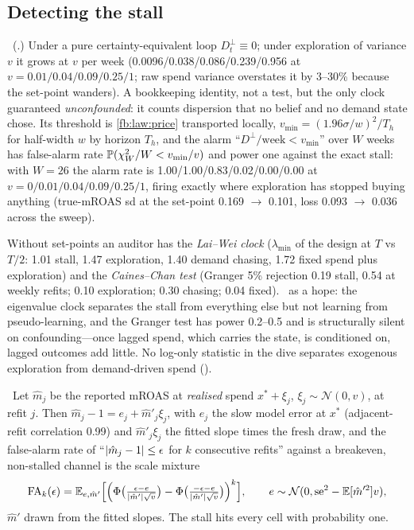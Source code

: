\subsection{Detecting the stall}

\begin{construction}
\label{fb:con:clock}
\tagEstablished\ (.) Under a pure certainty-equivalent loop $D^\perp_t \equiv 0$; under exploration of variance $v$ it grows at $v$ per week (0.0096/0.038/0.086/0.239/0.956 at $v = 0.01/0.04/0.09/0.25/1$; raw spend variance overstates it by 3--30\% because the set-point wanders). A bookkeeping identity, not a test, but the only clock guaranteed \emph{unconfounded}: it counts dispersion that no belief and no demand state chose. Its threshold is \cref{fb:law:price} transported locally, $v_{\min} = (1.96\sigma/w)^2/T_h$ for half-width $w$ by horizon $T_h$, and the alarm ``$D^\perp/\text{week} < v_{\min}$'' over $W$ weeks has false-alarm rate $\mathbb{P}(\chi^2_W/W < v_{\min}/v)$ and power one against the exact stall: with $W = 26$ the alarm rate is 1.00/1.00/0.83/0.02/0.00/0.00 at $v = 0/0.01/0.04/0.09/0.25/1$, firing exactly where exploration has stopped buying anything (true-mROAS sd at the set-point 0.169 $\to$ 0.101, loss 0.093 $\to$ 0.036 across the sweep).
\end{construction}

Without set-points an auditor has the \emph{Lai--Wei clock} ($\lambda_{\min}$ of the design at $T$ vs $T/2$: 1.01 stall, 1.47 exploration, 1.40 demand chasing, 1.72 fixed spend plus exploration) and the \emph{Caines--Chan test} (Granger 5\% rejection 0.19 stall, 0.54 at weekly refits; 0.10 exploration; 0.30 chasing; 0.04 fixed). \tagRefuted\ as a hope: the eigenvalue clock separates the stall from everything else but not learning from pseudo-learning, and the Granger test has power 0.2--0.5 and is structurally silent on confounding---once lagged spend, which carries the state, is conditioned on, lagged outcomes add little. No log-only statistic in the dive separates exogenous exploration from demand-driven spend ().

\begin{law}
\label{fb:law:echo}
\tagNumerical\ Let $\hat m_j$ be the reported mROAS at \emph{realised} spend $x^* + \xi_j$, $\xi_j \sim \mathcal N(0, v)$, at refit $j$. Then $\hat m_j - 1 = e_j + \hat m'_j\xi_j$, with $e_j$ the slow model error at $x^*$ (adjacent-refit correlation 0.99) and $\hat m'_j\xi_j$ the fitted slope times the fresh draw, and the false-alarm rate of ``$\left|\hat m_j - 1\right| \le \epsilon$ for $k$ consecutive refits'' against a breakeven, non-stalled channel is the scale mixture
\begin{equation}
\mathrm{FA}_k(\epsilon) = \mathbb{E}_{e,\hat m'}\Big[\Big(\Phi\big(\tfrac{\epsilon - e}{\left|\hat m'\right|\sqrt v}\big) - \Phi\big(\tfrac{-\epsilon - e}{\left|\hat m'\right|\sqrt v}\big)\Big)^k\Big],\qquad e \sim \mathcal N(0, \mathrm{se}^2 - \mathbb{E}[\hat m'^2]v),
\label{eq:fb:fa}
\end{equation}
$\hat m'$ drawn from the fitted slopes. The stall hits every cell with probability one.
\end{law}


